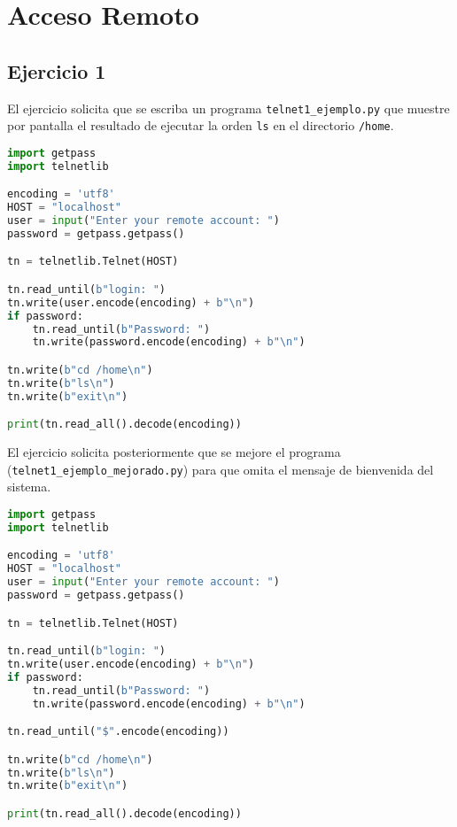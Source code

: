 
\section{Acceso Remoto}

\subsection{Ejercicio 1}

El ejercicio solicita que se escriba un programa \lstinline{telnet1_ejemplo.py}
que muestre por pantalla el resultado de ejecutar la orden \lstinline{ls} en el
directorio \lstinline{/home}.

\begin{lstlisting}[language=Python]
import getpass
import telnetlib

encoding = 'utf8'
HOST = "localhost"
user = input("Enter your remote account: ")
password = getpass.getpass()

tn = telnetlib.Telnet(HOST)

tn.read_until(b"login: ")
tn.write(user.encode(encoding) + b"\n")
if password:
    tn.read_until(b"Password: ")
    tn.write(password.encode(encoding) + b"\n")

tn.write(b"cd /home\n")
tn.write(b"ls\n")
tn.write(b"exit\n")

print(tn.read_all().decode(encoding))
\end{lstlisting}

El ejercicio solicita posteriormente que se mejore el programa
(\lstinline{telnet1_ejemplo_mejorado.py}) para que omita el mensaje de bienvenida del sistema.

\begin{lstlisting}[language=Python]
import getpass
import telnetlib

encoding = 'utf8'
HOST = "localhost"
user = input("Enter your remote account: ")
password = getpass.getpass()

tn = telnetlib.Telnet(HOST)

tn.read_until(b"login: ")
tn.write(user.encode(encoding) + b"\n")
if password:
    tn.read_until(b"Password: ")
    tn.write(password.encode(encoding) + b"\n")

tn.read_until("$".encode(encoding))

tn.write(b"cd /home\n")
tn.write(b"ls\n")
tn.write(b"exit\n")

print(tn.read_all().decode(encoding))
\end{lstlisting}


